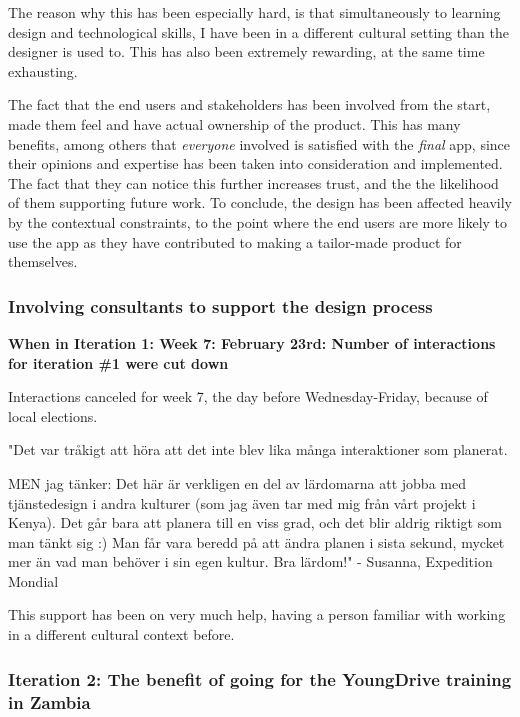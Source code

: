   The reason why this has been especially hard, is that simultaneously to learning design and technological skills, I have been in a different cultural setting than the designer is used to. This has also been extremely rewarding, at the same time exhausting.

  The fact that the end users and stakeholders has been involved from the start, made them feel and have actual ownership of the product. This has many benefits, among others that \textit{everyone} involved is satisfied with the \textit{final} app, since their opinions and expertise has been taken into consideration and implemented. The fact that they can notice this further increases trust, and the the likelihood of them supporting future work. To conclude, the design has been affected heavily by the contextual constraints, to the point where the end users are more likely to use the app as they have contributed to making a tailor-made product for themselves.

  \subsubsection{Involving consultants to support the design process}


  \textbf{When in Iteration 1: Week 7: February 23rd: Number of interactions for iteration \#1 were cut down}

  Interactions canceled for week 7, the day before Wednesday-Friday, because of local elections.

  "Det var tråkigt att höra att det inte blev lika många interaktioner som planerat.

  MEN jag tänker: Det här är verkligen en del av lärdomarna att jobba med tjänstedesign i andra kulturer (som jag även tar med mig från vårt projekt i Kenya). Det går bara att planera till en viss grad, och det blir aldrig riktigt som man tänkt sig :) Man får vara beredd på att ändra planen i sista sekund, mycket mer än vad man behöver i sin egen kultur. Bra lärdom!" - Susanna, Expedition Mondial

  This support has been on very much help, having a person familiar with working in a different cultural context before.

  \subsubsection{Iteration 2: The benefit of going for the YoungDrive training in Zambia}

